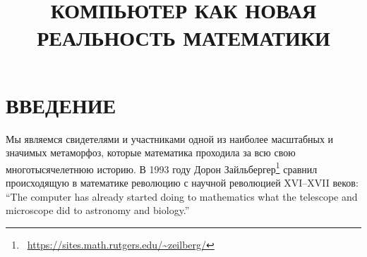 \documentclass[intlimits,twoside,a4paper,11pt]{article}
\title[Компьютер как новая реальность математики]{КОМПЬЮТЕР КАК 
	НОВАЯ РЕАЛЬНОСТЬ МАТЕМАТИКИ}
\begin{document}
	\maketitle

	\section{ВВЕДЕНИЕ}
	
	Мы являемся свидетелями и участниками одной из наиболее масштабных и 
	значимых метаморфоз, которые математика проходила за всю свою 
	многотысячелетнюю историю. В 1993 году Дорон 
	Зайльбергер\footnote{~\url{https://sites.math.rutgers.edu/\~zeilberg/}} \cite{Ze} 
	сравнил происходящую в
	математике революцию с научной революцией XVI--XVII веков: 
	``The computer has already started doing to mathematics what the 
	telescope and microscope did to astronomy and biology.''
	
\end{document}
